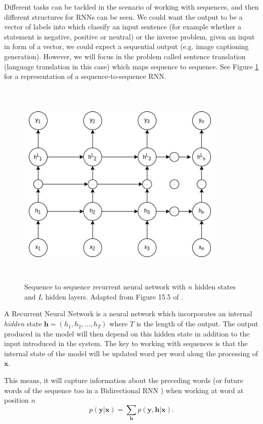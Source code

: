 \documentclass[11pt,english,listoffigures,listoftables]{tfgetsinf}
\newcommand{\vect}[1]{\mathbf{#1}}
\begin{document}
Different tasks can be tackled in the scenario of working with sequences, and then different structures for RNNs can be seen. We could want the output to be a vector of labels into which classify an input sentence (for example whether a statement is negative, positive or neutral) or the inverse problem, given an input in form of a vector, we could expect a sequential output (e.g. image captioning generation). However, we will focus in the problem called sentence translation (language translation in this case) which maps sequence to sequence. See Figure \ref{chap1:seq2seq} for a representation of a sequence-to-sequence RNN.

\begin{figure}
\centering
\includegraphics[width=10cm,keepaspectratio,height=10cm]{resources/seq2seq.png}
\caption{Sequence to sequence recurrent neural network with $n$ hidden states and $L$ hidden layers. Adapted from Figure 15.5 of \cite{pml1Book}.}\label{chap1:seq2seq}
\end{figure}

A Recurrent Neural Network is a neural network which incorporates an internal \textit{hidden} state $\vect{h} = (h_1, h_2, ..., h_T)$ where $T$ is the length of the output. The output produced in the model will then depend on this hidden state in addition to the input introduced in the system.
The key to working with sequences is that the internal state of the model will be updated word per word along the processing of $\vect{x}$. 

This means, it will capture information about the preceding words (or future words of the sequence too in a Bidirectional RNN \cite{650093}) when working at word at position $n$
\begin{equation}
    p(\vect{y}|\vect{x}) = \sum_\vect{h} p(\vect{y},\vect{h}|\vect{x}).
\end{equation}
\end{document}
